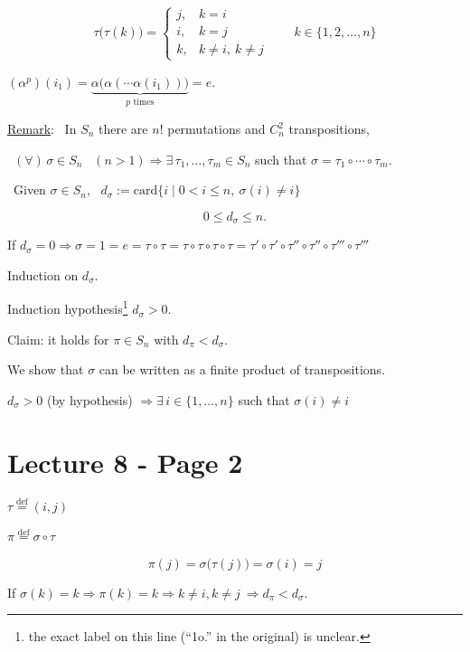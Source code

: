 \[
\tau\big(\tau(k)\big)=
\begin{cases}
j, & k=i\\
i, & k=j\\
k, & k\neq i,\ k\neq j
\end{cases}
\qquad k\in\{1,2,\ldots,n\}
\]

\bigskip
\noindent $(\alpha^p)(i_1) = \underbrace{\alpha\big(\alpha(\cdots\alpha(i_1))\big)}_{p \text{ times}} = e.$

\bigskip
\noindent\underline{Remark}: \ In $S_n$ there are $n!$ permutations and $C_n^2$ transpositions,

\bigskip
\noindent{} \ $(\forall)\,\sigma\in S_n$ \ $(n>1) \Rightarrow \exists\,\tau_1,\ldots,\tau_m\in S_n$ such that $\sigma=\tau_1\circ\cdots\circ\tau_m$.

\bigskip
\noindent{} \ Given $\sigma\in S_n$, \ $d_\sigma := \text{card}\{i \mid 0<i\leq n,\ \sigma(i)\neq i\}$

\[
0\leq d_\sigma\leq n.
\]

\bigskip
\noindent If $d_\sigma=0 \Rightarrow \sigma=1=e=\tau\circ\tau=\tau\circ\tau\circ\tau\circ\tau=\tau'\circ\tau'\circ\tau''\circ\tau''\circ\tau'''\circ\tau'''$

\bigskip
\noindent Induction on $d_\sigma$.

\noindent Induction hypothesis\footnote{the exact label on this line (``1o.'' in the original) is unclear.} $d_\sigma>0$.

\bigskip
\noindent Claim: it holds for $\pi\in S_n$ with $d_\pi<d_\sigma$.

\noindent We show that $\sigma$ can be written as a finite product of transpositions.

\noindent $d_\sigma>0$ (by hypothesis) $\Rightarrow \exists\,i\in\{1,\ldots,n\}$ such that $\sigma(i)\neq i$



\section*{Lecture 8 - Page 2}

\noindent $\tau \overset{\text{def}}{=} (i,j)$

\noindent $\pi \overset{\text{def}}{=} \sigma\circ\tau$

\[
\pi(j) = \sigma\big(\tau(j)\big) = \sigma(i) = j
\]

\bigskip
\noindent If $\sigma(k)=k \Rightarrow \pi(k)=k \Rightarrow k\neq i, k\neq j \ \Rightarrow d_\pi<d_\sigma.$

